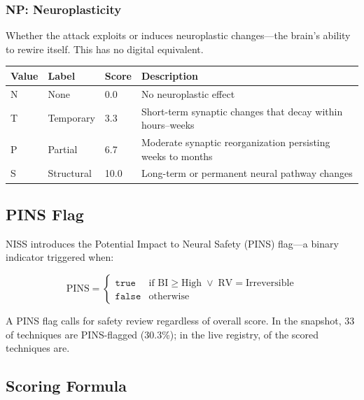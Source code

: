\subsubsection{NP: Neuroplasticity}

Whether the attack exploits or induces neuroplastic changes---the brain's ability
to rewire itself. This has no digital equivalent.

\begin{table}[H]
\centering
\small
\begin{tabular}{@{}l l l p{7cm}@{}}
\toprule
\textbf{Value} & \textbf{Label} & \textbf{Score} & \textbf{Description} \\
\midrule
N & None       & 0.0  & No neuroplastic effect \\
T & Temporary  & 3.3  & Short-term synaptic changes that decay within hours--weeks \\
P & Partial    & 6.7  & Moderate synaptic reorganization persisting weeks to months \\
S & Structural & 10.0 & Long-term or permanent neural pathway changes \\
\bottomrule
\end{tabular}
\end{table}

\subsection{PINS Flag}

NISS introduces the Potential Impact to Neural Safety (PINS) flag---a
binary indicator triggered when:

\begin{equation}
\text{PINS} = \begin{cases}
  \texttt{true} & \text{if } \text{BI} \geq \text{High} \;\lor\; \text{RV} = \text{Irreversible} \\
  \texttt{false} & \text{otherwise}
\end{cases}
\end{equation}

A PINS flag calls for safety review regardless of overall score. In the snapshot, 33 of
\SnapshotTechniques{} techniques are PINS-flagged (30.3\%); in the live registry,
\LivePinsFlagged{} of the \LiveNissScored{} scored techniques are.

\subsection{Scoring Formula}

